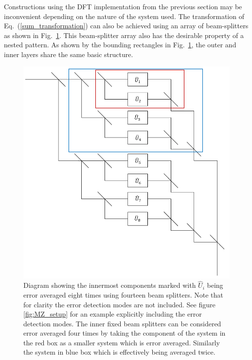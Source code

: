 \documentclass[aps,pra,twocolumn,superscriptaddress,numerical,floatfix]{revtex4-1}
\begin{document}
Constructions using the DFT implementation from the previous section may be inconvenient depending on the nature of the system used.  The transformation of Eq.~(\ref{sum_transformation}) can also be achieved using an array of beam-splitters as shown in Fig.~\ref{fig:gen system}.  This beam-splitter array also has the desirable property of a nested pattern.  As shown by the bounding rectangles in Fig.~\ref{fig:gen system}, the outer and inner layers share the same basic structure. 
%
\begin{figure}[tbh]
	\includegraphics[width=\columnwidth]{unitaries.PNG}
	\caption{\label{fig:gen system}Diagram showing the innermost components marked with $\hat{U}_i$ being error averaged eight times using fourteen beam splitters. Note that for clarity the error detection modes are not included. See figure \ref{fig:MZ_setup} for an example explicitly including the error detection modes. The inner fixed beam splitters can be considered error averaged four times by taking the component of the system in the red box as a smaller system which is error averaged. Similarly the system in blue box which is effectively being averaged twice.}
\end{figure}
	
	
\end{document}
